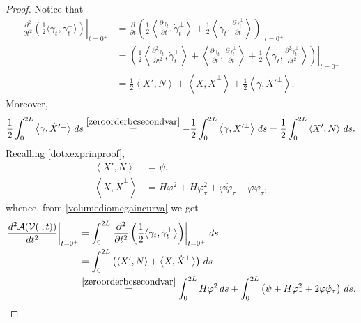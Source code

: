 \documentclass[11pt]{amsart}
\newcommand{\A}{\mathcal A}
\theoremstyle{definition}
\theoremstyle{remark}
\numberwithin{equation}{section}
\begin{document}
\begin{proof}
Notice that
\begin{equation*}
	\begin{split}
		\left.\frac{\partial^2}{\partial t^2}\left(\frac{1}{2}\big\langle \gamma_t,\dot\gamma_t^\perp\big\rangle\right)\right|_{t=0^+}&=\left.\frac{\partial}{\partial t}\left(\frac{1}{2}\left\langle \frac{\partial\gamma_t}{\partial t},\dot\gamma_t^\perp\right\rangle+\frac{1}{2}\left\langle \gamma_t,\frac{\partial\dot\gamma_t^\perp}{\partial t}\right\rangle\right)\right|_{t=0^+}\\
		&=\left.\left(\frac{1}{2}\left\langle \frac{\partial^2\gamma_t}{\partial t^2},\dot\gamma_t^\perp\right\rangle+\left\langle \frac{\partial\gamma_t}{\partial t},\frac{\partial\dot\gamma_t^\perp}{\partial t}\right\rangle+\frac{1}{2}\left\langle \gamma_t,\frac{\partial^2\dot\gamma_t^\perp}{\partial t^2}\right\rangle\right)\right|_{t=0^+}\\
		&=\frac{1}{2}\left\langle X',N \right\rangle+\left\langle X,\dot X^\perp\right\rangle+\frac{1}{2}\left\langle \gamma,\dot X'^\perp\right\rangle.
	\end{split}
\end{equation*}
Moreover,
\begin{equation*}
	\frac{1}{2}\int_0^{2L}\left\langle \gamma,\dot X'^\perp\right\rangle\,ds\overset{\eqref{zeroorderbcsecondvar}}{=}-\frac{1}{2}\int_{0}^{2L}\left\langle \dot\gamma, X'^\perp\right\rangle\,ds=\frac{1}{2}\int_{0}^{2L}\left\langle X',N\right\rangle\,ds.
\end{equation*}
Recalling \eqref{dotxexprinproof},
\begin{align*}
	\left \langle X',N\right\rangle&=\psi,\\
	\left\langle X,\dot X^\perp\right\rangle&=H\varphi^2+H\varphi_\tau^2+\varphi\dot\varphi_\tau-\dot\varphi\varphi_\tau,
\end{align*}
whence, from \eqref{volumediomegaincurva} we get
\begin{equation*}
	\begin{split}
		\left.\frac{d^2\A(\mathcal V(\cdot,t))}{dt^2}\right|_{t=0^+}&=\int_{0}^{2L}\left.\frac{\partial^2}{\partial t^2}\left(\frac{1}{2}\big\langle \gamma_t,\dot\gamma_t^\perp\big\rangle\right)\right|_{t=0^+}\,ds\\
		&=\int_{0}^{2L}\left(\left\langle X',N \right\rangle+\left\langle X,\dot X^\perp\right\rangle\right)\,ds\\
		&\overset{\eqref{zeroorderbcsecondvar}}{=}\int_0^{2L}H\varphi^2\,ds+\int_0^{2L}\left(\psi+H\varphi_\tau^2+2\varphi\dot\varphi_\tau\right)\,ds.\qedhere
	\end{split}
\end{equation*}
\end{proof}
\end{document}
